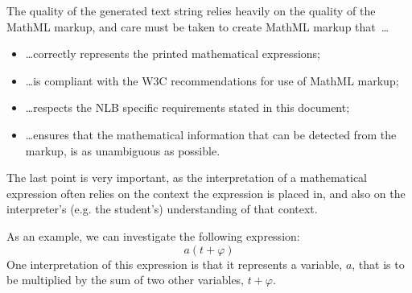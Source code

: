 \documentclass[english,a4paper,11pt]{article}
\begin{document}
\begin{center}
\end{center}
The quality of the generated text string relies heavily on the quality of the MathML markup, and care must be taken to create MathML markup that~\ldots
\begin{itemize}
	\item \ldots correctly represents the printed mathematical expressions;
	\item \ldots is compliant with the W3C recommendations for use of MathML markup;
	\item \ldots respects the NLB specific requirements stated in this document;
	\item \ldots ensures that the mathematical information that can be detected from the markup, is as unambiguous as possible.
\end{itemize}
The last point is very important, as the interpretation of a mathematical expression often relies on the context  the expression is placed in, and also on the interpreter's (e.g. the student's) understanding of that context.

As an example, we can investigate the following expression:
\[
a (t + \varphi)
\]
One interpretation of this expression is that it represents a variable, $a$, that is to be multiplied by the sum of two other variables, $t + \varphi$.
 
\end{document}
